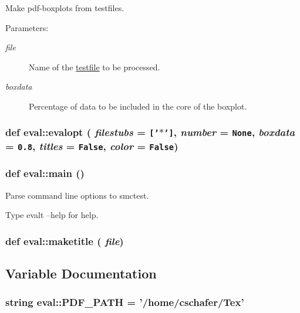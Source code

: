 Make pdf-boxplots from testfiles. 

\begin{Desc}
\item[Parameters:]
\begin{description}
\item[{\em file}]Name of the \hyperlink{namespacetestfile}{testfile} to be processed. \item[{\em boxdata}]Percentage of data to be included in the core of the boxplot. \end{description}
\end{Desc}
\hypertarget{namespaceeval_0dcd0d97820f287e38e356cdf3da3a0c}{
\subsubsection[{evalopt}]{\setlength{\rightskip}{0pt plus 5cm}def eval::evalopt ( {\em filestubs} = {\tt \mbox{[}'$\ast$'\mbox{]}}, \/   {\em number} = {\tt None}, \/   {\em boxdata} = {\tt 0.8}, \/   {\em titles} = {\tt False}, \/   {\em color} = {\tt False})}}
\label{namespaceeval_0dcd0d97820f287e38e356cdf3da3a0c}


\hypertarget{namespaceeval_e3b126f2e6d2aa6c1ed96ecf02d91e8d}{
\subsubsection[{main}]{\setlength{\rightskip}{0pt plus 5cm}def eval::main ()}}
\label{namespaceeval_e3b126f2e6d2aa6c1ed96ecf02d91e8d}


Parse command line options to smctest. 

Type evalt --help for help. \hypertarget{namespaceeval_2852fcd5af5e95c3f5548a3a51b0c52e}{
\subsubsection[{maketitle}]{\setlength{\rightskip}{0pt plus 5cm}def eval::maketitle ( {\em file})}}
\label{namespaceeval_2852fcd5af5e95c3f5548a3a51b0c52e}




\subsection{Variable Documentation}
\hypertarget{namespaceeval_0f22d22751fdd8f5b825e7484476fe1d}{
\subsubsection[{PDF\_\-PATH}]{\setlength{\rightskip}{0pt plus 5cm}string {\bf eval::PDF\_\-PATH} = '/home/cschafer/Tex'}}
\label{namespaceeval_0f22d22751fdd8f5b825e7484476fe1d}


